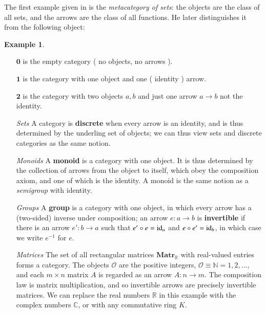 \documentclass[12pt]{article}
\numberwithin{equation}{section}
\theoremstyle{definition}
\newtheorem{eg}{Example}
\newcommand{		\C		}	{	\mathbb{C}				}
\newcommand{		\N		}	{	\mathbb{N}				}
\newcommand{		\R		}	{	\mathbb{R}				}
\newcommand{		\id		}	{	{\text{\rm id}}		}
\newcommand{		\matr		}	{	{\mathbf{ Matr}}		}
\newcommand{		\B		}	{\textbf					} %
\newcommand{		\1		}	{	\bm{1}					}%
\begin{document}
The first example given in \cite{MacLane} is the \emph{metacategory of sets}: the objects are the class of all sets, and the arrows are the class of all functions. He later distinguishes it from the following object: 






\vspace{5mm}

\begin{mdframed}
\begin{eg}

\begin{itemize}
\item[ $\mathbf{0}$ ] is the empty category ( no objects, no arrows ). 
\item[ $\mathbf{1}$ ] is the category with one object and one ( identity ) arrow.
\item[ $\mathbf{2}$ ] is the category with two objects $a, b$ and just one arrow $a \to b$ not the identity. 
\item [ \emph{Sets} ] A category is \B{discrete} when every arrow is an identity, and is thus determined by the underling set of objects; we can thus view sets and discrete categories as the same notion. 

\item [ \emph{Monoids} ] A \B{monoid} is a category with one object. It is thus determined by the collection of arrows from the object to itself, which obey the composition axiom, and one of which is the identity. A monoid is the same notion as a \emph{semigroup} with identity. 

\item [ \emph{Groups} ] A \B{group} is a category with one object, in which every arrow has a (two-sided) inverse under composition; an arrow $e : a \to b$ is \B{invertible} if there is an arrow $e' : b \to a$ such that $e' \circ e = \id_a$ and $e \circ e' = \id_b$, in which case we write $e^{-1}$ for $e$. 


\item [ \emph{Matrices} ] The set of all rectangular matrices $\matr_{\mathbb{R}}$ with real-valued entries forms a category. The objects $\mathcal{O}$ are the positive integers, $\mathcal{O} \equiv \N = 1,2, \dots $, and each $m \times n$ matrix $A$ is regarded as an arrow $A: n \to m$. The composition law is matrix multiplication, and so invertible arrows are precisely invertible matrices. We can replace the real numbers $\R$ in this example with the complex numbers $\C$, or with any commutative ring $K$. 
\end{itemize}

\end{eg} 
\end{mdframed}
\end{document}
